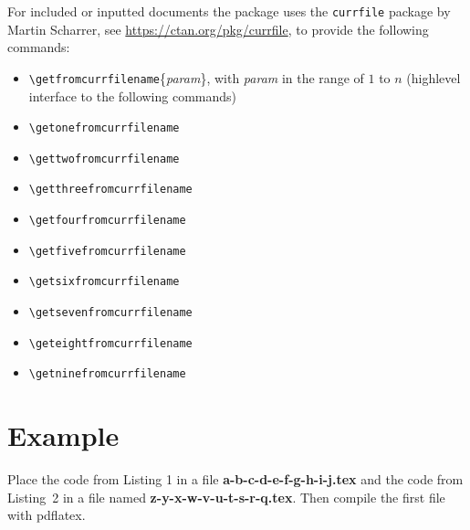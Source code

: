 ﻿\documentclass[12pt]{scrartcl}
\begin{document}
For included or inputted documents the package uses the \texttt{currfile} package  by Martin Scharrer, see \url{https://ctan.org/pkg/currfile}, to provide the following commands: 

\begin{itemize}
	\item \verb|\getfromcurrfilename|\{\textit{param}\}, with \textit{param} in the
	 range of $1$ to $n$ (highlevel interface to the following commands)
	\item \verb|\getonefromcurrfilename|
	\item \verb|\gettwofromcurrfilename|
	\item \verb|\getthreefromcurrfilename|
	\item \verb|\getfourfromcurrfilename|
	\item \verb|\getfivefromcurrfilename|
	\item \verb|\getsixfromcurrfilename|
	\item \verb|\getsevenfromcurrfilename|
	\item \verb|\geteightfromcurrfilename|
	\item \verb|\getninefromcurrfilename|	
\end{itemize}

\section*{Example}

Place the code from Listing 1 in a file \textbf{a-b-c-d-e-f-g-h-i-j.tex} and the code from
 Listing~2 in a file named \textbf{z-y-x-w-v-u-t-s-r-q.tex}. Then compile the first file with pdflatex.
\end{document}
